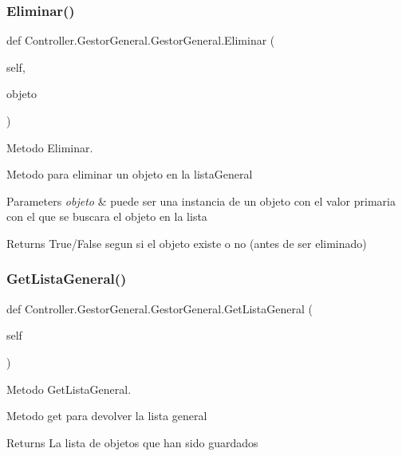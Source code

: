 \subsubsection{\texorpdfstring{Eliminar()}{Eliminar()}}
{\footnotesize\ttfamily def Controller.\+Gestor\+General.\+Gestor\+General.\+Eliminar (\begin{DoxyParamCaption}\item[{}]{self,  }\item[{}]{objeto }\end{DoxyParamCaption})}



Metodo Eliminar. 

Metodo para eliminar un objeto en la lista\+General 
\begin{DoxyParams}{Parameters}
{\em objeto} & puede ser una instancia de un objeto con el valor primaria con el que se buscara el objeto en la lista \\
\hline
\end{DoxyParams}
\begin{DoxyReturn}{Returns}
True/\+False segun si el objeto existe o no (antes de ser eliminado) 
\end{DoxyReturn}
\mbox{\label{class_controller_1_1_gestor_general_1_1_gestor_general_af0302d39caf2be664abae8a96594c416}} 
\subsubsection{\texorpdfstring{Get\+Lista\+General()}{GetListaGeneral()}}
{\footnotesize\ttfamily def Controller.\+Gestor\+General.\+Gestor\+General.\+Get\+Lista\+General (\begin{DoxyParamCaption}\item[{}]{self }\end{DoxyParamCaption})}



Metodo Get\+Lista\+General. 

Metodo get para devolver la lista general \begin{DoxyReturn}{Returns}
La lista de objetos que han sido guardados 
\end{DoxyReturn}
\mbox{\label{class_controller_1_1_gestor_general_1_1_gestor_general_a61090b6b006fcc791c2fe55f251405e4}} 
